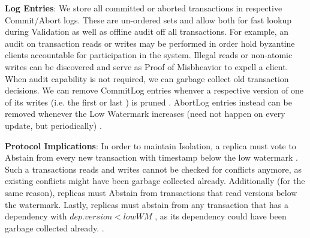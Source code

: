\textbf{Log Entries}: We store all committed or aborted transactions in respective Commit/Abort logs. These are un-ordered sets and allow both for fast lookup during Validation as well as offline audit off all transactions. For example, an audit on transaction reads or writes may be performed in order hold byzantine clients accountable for participation in the system. Illegal reads or non-atomic writes can be discovered and serve as Proof of Misbheavior to expell a client. When audit capability is not required, we can garbage collect old transaction decisions. We can remove CommitLog entries whenver a respective version of one of its writes (i.e. the first  or last ) is pruned . AbortLog entries instead can be removed whenever the Low Watermark increases (need not happen on every update, but periodically) . 

\textbf{Protocol Implications}:
In order to maintain Isolation, a replica must vote to Abstain from every new transaction with timestamp below the low watermark . Such a transactions reads and writes cannot be checked for conflicts anymore, as existing conflicts might have been garbage collected already.  Additionally (for the same reason), replicas must Abstain from transactions that read versions below the watermark.
Lastly, replicas must abstain from any transaction that has a dependency with $dep.version  < lowWM$ , as its dependency could have been garbage collected already. . 

